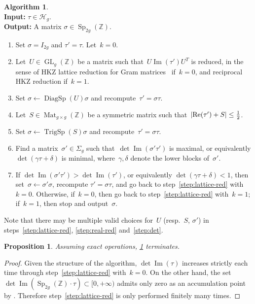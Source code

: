 \documentclass[12pt,oneside]{amsart}
\numberwithin{equation}{section}
\newtheorem{prop}[equation]{Proposition}
\theoremstyle{definition}
\newtheorem{algorithm}[equation]{Algorithm}
\newcommand{\algoinput}[1]{~\\ \noindent\textbf{Input:} #1}
\newcommand{\algooutput}[1]{~\\ \noindent\textbf{Output:} #1}
\newcommand{\Z}{\mathbb{Z}}
\newcommand{\Half}{\mathcal{H}}
\DeclareMathOperator{\im}{Im}
\DeclareMathOperator{\re}{Re}
\DeclareMathOperator{\Sp}{Sp}
\DeclareMathOperator{\GL}{GL}
\DeclareMathOperator{\Mat}{Mat}
\DeclareMathOperator{\TrigSp}{TrigSp}
\DeclareMathOperator{\DiagSp}{DiagSp}
\DeclarePairedDelimiter{\abs}{|}{|}
\begin{document}
\begin{algorithm}
  \label{algo:siegel-red}
  \algoinput{$\tau\in \Half_g$.}  \algooutput{A matrix
    $\sigma\in \Sp_{2g}(\Z)$.}
  \begin{enumerate}
  \item Set $\sigma = I_{2g}$ and $\tau' = \tau$. Let~$k=0$.
  \item \label{step:lattice-red} Let~$U\in \GL_g(\Z)$ be a matrix such
    that~$U\im(\tau') U^T$ is reduced, in the sense of HKZ lattice reduction
    for Gram matrices~\cite{lagariasKorkinZolotarevBasesSuccessive1990}
    if~$k=0$, and reciprocal HKZ reduction if~$k=1$.
  \item Set
    $\sigma\gets \DiagSp(U)\sigma$ and recompute~$\tau' = \sigma\tau$.
  \item \label{step:real-red} Let~$S\in \Mat_{g\times g}(\Z)$ be a symmetric
    matrix such that~$\abs{\re(\tau') + S}\leq \tfrac 12$.
  \item Set
    $\sigma\gets \TrigSp(S)\sigma$ and recompute~$\tau' = \sigma\tau$.
  \item \label{step:det} Find a matrix~$\sigma'\in \Sigma_g$ such
    that~$\det \im(\sigma'\tau')$ is maximal, or equivalently
    $\det(\gamma\tau + \delta)$ is minimal, where~$\gamma, \delta$ denote the
    lower blocks of~$\sigma'$.
  \item \label{step:red-back} If $\det\im(\sigma'\tau') > \det\im(\tau')$, or
    equivalently $\det(\gamma\tau + \delta) < 1$, then
    set~$\sigma \gets \sigma'\sigma$, recompute $\tau' = \sigma\tau$, and go
    back to step~\eqref{step:lattice-red} with~$k=0$. Otherwise, if~$k=0$, then
    go back to step~\eqref{step:lattice-red} with~$k=1$; if~$k=1$, then stop
    and output~$\sigma$.
  \end{enumerate}
\end{algorithm}

Note that there may be multiple valid choices for~$U$ (resp.~$S$, $\sigma'$) in
steps~\eqref{step:lattice-red}, \eqref{step:real-red} and~\eqref{step:det}.

\begin{prop}
  \label{prop:reduction-terminates}
  Assuming exact operations, \cref{algo:siegel-red} terminates.
\end{prop}

\begin{proof}
  Given the structure of the algorithm, $\det\im(\tau)$ increases strictly each
  time through step~\eqref{step:lattice-red} with~$k=0$. On the other hand, the
  set $\det \im(\Sp_{2g}(\Z)\cdot \tau)\subset [0,+\infty)$ admits only zero as
  an accumulation point by \cite[Lemma 1
  p.\,29]{klingenIntroductoryLecturesIegel1990}. Therefore
  step~\eqref{step:lattice-red} is only performed finitely many times.
\end{proof}
\end{document}
